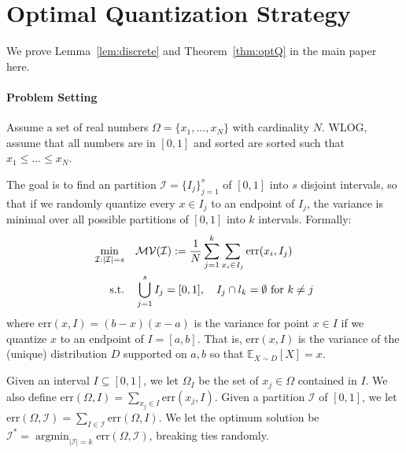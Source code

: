 \documentclass{article}
\def\E{\mathbb{E}}
\newcommand{\err}{\ensuremath{\mathrm{err}}}
\newcommand{\setX}{\Omega}
\newcommand{\setI}{\mathcal{I}}
\newcommand{\OPT}{\ensuremath{\mathrm{OPT}}}
\DeclareMathOperator*{\argmin}{argmin}
\begin{document}


\section{Optimal Quantization Strategy}

We prove Lemma~\ref{lem:discrete} and Theorem~\ref{thm:optQ} in the main paper here.

\paragraph*{Problem Setting}
Assume a set of real numbers $\Omega = \{x_1, \ldots, x_N\}$ with cardinality $N$. WLOG, assume that all numbers are in $[0, 1]$ and sorted are sorted such that $x_1 \leq \ldots \leq x_N$. 

The goal is to find an partition $\setI = \{I_j\}_{j = 1}^s$ of $[0, 1]$ into $s$ disjoint intervals, so that if we randomly quantize every $x \in I_j$ to an endpoint of $I_j$, the variance is minimal over all possible partitions of $[0, 1]$ into $k$ intervals.
Formally:
\begin{align}
\nonumber \min_{\setI: |\setI| = s} \quad & \mathcal{MV}(\setI) := {1\over N}\sum_{j = 1}^k \sum_{x_i \in I_j} \err(x_i, I_j)\\
\text{s.t.}\quad & \bigcup_{j = 1}^s I_j = [0, 1],\quad I_j\cap l_k = \emptyset~\text{for $k\neq j$}
\label{eq:opt_Q-2}
\end{align}
where $\err (x, I) = (b - x) (x - a)$ is the variance for point $x \in I$ if we quantize $x$ to an endpoint of $I = [a, b]$.\label{eq:var}
That is, $\err (x, I)$ is the variance of the (unique) distribution $D$ supported on ${a, b}$  so that $\E_{X \sim D} [X] = x$.


Given an interval $I \subseteq [0, 1]$, we let $\setX_I$ be the set of $x_j \in \setX$ contained in $I$.
We also define $\err (\setX, I) = \sum_{x_j \in I} \err (x_j, I)$.
Given a partition $\setI$ of $[0, 1]$, we let $\err (\setX, \setI) = \sum_{I \in \setI} \err (\setX, I)$.
We let the optimum solution be $\setI^* = \argmin_{|\setI| = k} \err (\setX, \setI)$, breaking ties randomly. %
\end{document}
